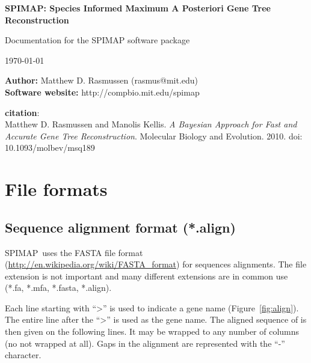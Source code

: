 \documentclass[11pt]{article}
\newcommand{\figref}[1]{Figure~\ref{#1}}
\newcommand{\spimap}{{\sf\scshape SPIMAP}}
\begin{document}

\begin{center}
{\Huge \bf 
SPIMAP: Species Informed Maximum A Posteriori Gene Tree Reconstruction
}

\vspace{.2in}

{\LARGE 
Documentation for the SPIMAP software package
}

{\LARGE \today}


\vspace{.5in}

{\bf Author:} Matthew D. Rasmussen (rasmus@mit.edu) \\
{\bf Software website:} http://compbio.mit.edu/spimap

\vspace{.1in}

{\bf citation}: \\
Matthew D. Rasmussen and Manolis Kellis.
{\it A Bayesian Approach for Fast and Accurate Gene Tree Reconstruction}.
Molecular Biology and Evolution. 2010. doi: 10.1093/molbev/msq189

\end{center}

\newpage

\tableofcontents

\newpage

\section{File formats}

\subsection{Sequence alignment format (*.align)}

\spimap\ uses the FASTA file format
(\url{http://en.wikipedia.org/wiki/FASTA\_format}) for sequences
alignments.  The file extension is not important and many different 
extensions are in common use (*.fa, *.mfa, *.fasta, *.align).

Each line starting with ``>'' is used to indicate a gene name
(\figref{fig:align}).  The entire line after the ``>'' is used as the
gene name.  The aligned sequence of is then given on the following
lines.  It may be wrapped to any number of columns (no not wrapped at
all).  Gaps in the alignment are represented with the ``-'' character.
\end{document}
